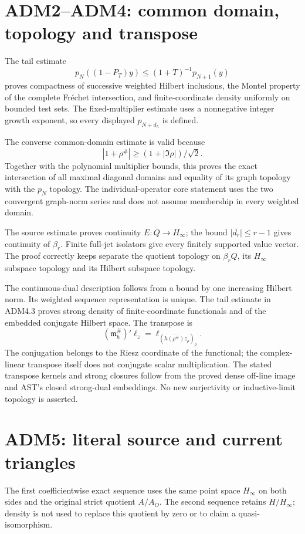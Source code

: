 \section{ADM2--ADM4: common domain, topology and
transpose}\label{adm2adm4-common-domain-topology-and-transpose}

The tail estimate \[
p_N((1-P_T)y)\le(1+T)^{-1}p_{N+1}(y)
\] proves compactness of successive weighted Hilbert inclusions, the
Montel property of the complete Fréchet intersection, and
finite-coordinate density uniformly on bounded test sets. The
fixed-multiplier estimate uses a nonnegative integer growth exponent, so
every displayed \(p_{N+d_h}\) is defined.

The converse common-domain estimate is valid because \[
|1+\rho^\#|\ge(1+|\Im\rho|)/\sqrt2.
\] Together with the polynomial multiplier bounds, this proves the exact
intersection of all maximal diagonal domains and equality of its graph
topology with the \(p_N\) topology. The individual-operator core
statement uses the two convergent graph-norm series and does not assume
membership in every weighted domain.

The source estimate proves continuity \(E:Q\to H_\infty\); the bound
\(|d_r|\le r-1\) gives continuity of \(\beta_r\). Finite full-jet
isolators give every finitely supported value vector. The proof
correctly keeps separate the quotient topology on \(\beta_rQ\), its
\(H_\infty\) subspace topology and its Hilbert subspace topology.

The continuous-dual description follows from a bound by one increasing
Hilbert norm. Its weighted sequence representation is unique. The tail
estimate in ADM4.3 proves strong density of finite-coordinate
functionals and of the embedded conjugate Hilbert space. The transpose
is \[
(\mathfrak m_h^\#)'\ell_z
=\ell_{(\overline{h(\rho^\#)}z_\rho)_\rho}.
\] The conjugation belongs to the Riesz coordinate of the functional;
the complex-linear transpose itself does not conjugate scalar
multiplication. The stated transpose kernels and strong closures follow
from the proved dense off-line image and AST's closed strong-dual
embeddings. No new surjectivity or inductive-limit topology is asserted.

\section{ADM5: literal source and current
triangles}\label{adm5-literal-source-and-current-triangles}

The first coefficientwise exact sequence uses the same point space
\(H_\infty\) on both sides and the original strict quotient \(A/A_O\).
The second sequence retains \(H/H_\infty\); density is not used to
replace this quotient by zero or to claim a quasi-isomorphism.

